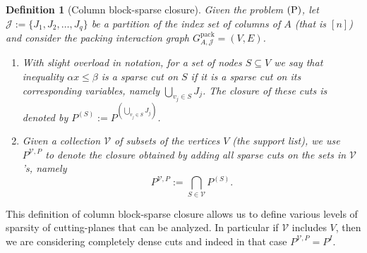 \documentclass[smallextended]{svjour3}
\newtheorem{definition}[proposition]{Definition}
\begin{document}
\begin{definition}[Column block-sparse closure]
Given the problem $\textup{(P)}$, let $\mathcal{J}:= \{J_1, J_2, \dots, J_q\}$ be a partition of the index set of columns of $A$ (that is $[n]$) and consider the packing interaction graph ${G^{\textrm{pack}}_{A, {\mathcal{J}}}} = (V, E)$. 
\begin{enumerate}
	\item With slight overload in notation, for a set of nodes $S \subseteq V$ we say that inequality $\alpha x \le \beta$ is a \emph{sparse cut on} $S$ if it is a sparse cut on its corresponding variables, namely $\bigcup_{v_j \in S} J_j$. The closure of these cuts is denoted by $P^{(S)} := P^{(\bigcup_{v_j \in S} J_j)}$.
	
	\item Given a collection $\mathcal{V}$ of subsets of the vertices $V$ (the \emph{support list}), we use ${P^{\mathcal{V},P}}$ to denote the closure obtained by adding all sparse cuts on the sets in $\mathcal{V}$'s, namely $$P^{\mathcal{V}, P} := \bigcap_{S \in \mathcal{V}} P^{(S)}.$$
\end{enumerate}
\end{definition}

This definition of column block-sparse closure allows us to define various levels of sparsity of cutting-planes that can be analyzed. In particular if $\mathcal{V}$ includes $V$, then we are considering completely dense cuts and indeed in that case $P^{\mathcal{V}, P} = P^I$.
\end{document}
